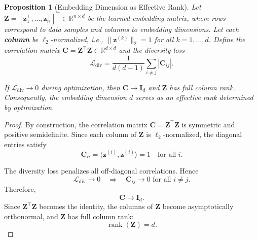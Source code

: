 \documentclass[10pt,a4paper]{amsart}
\newtheorem{proposition}{Proposition}
\begin{document}
\begin{proposition}[Embedding Dimension as Effective Rank]\label{prop:embedding_rank}
	Let $\mathbf{Z} = [\mathbf{z}_1^\top, \dots, \mathbf{z}_n^\top]^\top \in \mathbb{R}^{n\times d}$ be the learned embedding matrix, 
	where rows correspond to data samples and columns to embedding dimensions. 
	Let each \textbf{column} be $\ell_2$-normalized, i.e., $\|\mathbf{z}^{(k)}\|_2 = 1$ for all $k=1,\dots,d$. 
	Define the correlation matrix $\mathbf{C} = \mathbf{Z}^\top\mathbf{Z} \in \mathbb{R}^{d\times d}$ and the diversity loss
	\begin{equation}\label{eq:dl}
		\mathcal{L}_{\text{div}} = \frac{1}{d(d-1)} \sum_{i \neq j} |\mathbf{C}_{ij}|.
	\end{equation}
	
	If $\mathcal{L}_{\text{div}} \to 0$ during optimization, then $\mathbf{C} \to \mathbf{I}_d$ and $\mathbf{Z}$ has full column rank.
	Consequently, the embedding dimension $d$ serves as an effective rank determined by optimization.
\end{proposition}

\begin{proof}
	By construction, the correlation matrix $\mathbf{C} = \mathbf{Z}^\top \mathbf{Z}$ is symmetric and positive semidefinite.
	Since each column of $\mathbf{Z}$ is $\ell_2$-normalized, the diagonal entries satisfy
	\[
	\mathbf{C}_{ii} = \langle \mathbf{z}^{(i)}, \mathbf{z}^{(i)} \rangle = 1 \quad \text{for all } i.
	\]
	
	The diversity loss penalizes all off-diagonal correlations. Hence
	\[
	\mathcal{L}_{\text{div}} \to 0 \quad \Rightarrow \quad \mathbf{C}_{ij} \to 0 \text{ for all } i \neq j.
	\]
	Therefore,
	\[
	\mathbf{C} \to \mathbf{I}_d.
	\]
	Since $\mathbf{Z}^\top \mathbf{Z}$ becomes the identity, the columns of $\mathbf{Z}$ become asymptotically orthonormal, and $\mathbf{Z}$ has full column rank:
	\[
	\operatorname{rank}(\mathbf{Z}) = d.
	\]
\end{proof}
\end{document}
